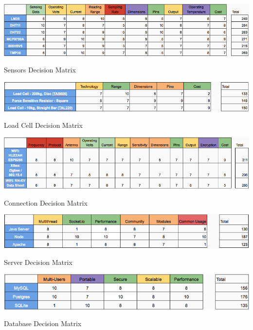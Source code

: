 \documentclass[12pt]{article}
\begin{document}
\begin{appendix}
  \begin{table}[!htb]
    \includegraphics[width=\textwidth]{Figures/DecisionMatrixSensors}
    \caption{Sensors Decision Matrix}
     \label{tabl:DecSensors}
  \end{table}

  \begin{table}[!htb]
    \includegraphics[width=\textwidth]{Figures/DecisionMatrixLoadCell}
    \caption{Load Cell Decision Matrix}
     \label{tabl:DecLoadCell}
  \end{table}

  \begin{table}[!htb]
    \includegraphics[width=\textwidth]{Figures/DecisionMatrixConnection}
    \caption{Connection Decision Matrix}
     \label{tabl:DecConnection}
  \end{table}

  \begin{table}[!htb]
    \includegraphics[width=\textwidth]{Figures/DecisionMatrixServer}
    \caption{Server Decision Matrix}
     \label{tabl:DecServer}
  \end{table}

  \begin{table}[!htb]
    \includegraphics[width=\textwidth]{Figures/DecisionMatrixDatabase}
    \caption{Database Decision Matrix}
     \label{tabl:DecDatabase}
  \end{table}

\end{appendix}
\newpage





\end{document}
